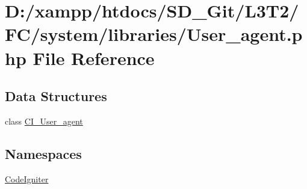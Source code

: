 \hypertarget{_user__agent_8php}{}\section{D\+:/xampp/htdocs/\+S\+D\+\_\+\+Git/\+L3\+T2/\+F\+C/system/libraries/\+User\+\_\+agent.php File Reference}
\label{_user__agent_8php}
\subsection*{Data Structures}
\begin{DoxyCompactItemize}
\item 
class \hyperlink{class_c_i___user__agent}{C\+I\+\_\+\+User\+\_\+agent}
\end{DoxyCompactItemize}
\subsection*{Namespaces}
\begin{DoxyCompactItemize}
\item 
 \hyperlink{namespace_code_igniter}{Code\+Igniter}
\end{DoxyCompactItemize}
